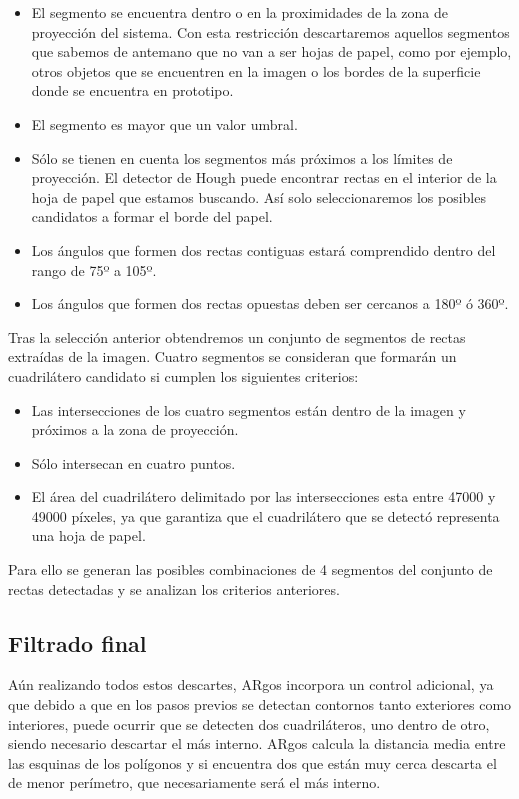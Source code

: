 \begin{itemize}
\item El segmento se encuentra dentro o en la proximidades de la zona de proyección del
  sistema. Con esta restricción descartaremos aquellos segmentos que sabemos de antemano que no van
  a ser hojas de papel, como por ejemplo, otros objetos que se encuentren en la imagen o los bordes
  de la superficie donde se encuentra en prototipo.
\item El segmento es mayor que un valor umbral.
\item Sólo se tienen en cuenta los segmentos más próximos a los límites de proyección. El detector
  de Hough puede encontrar rectas en el interior de la hoja de papel que estamos buscando. Así solo
  seleccionaremos los posibles candidatos a formar el borde del papel.
\item Los ángulos que formen dos rectas contiguas estará comprendido dentro del rango de 75º a 105º.
\item Los ángulos que formen dos rectas opuestas deben ser cercanos a 180º ó 360º.
\end{itemize}

Tras la selección anterior obtendremos un conjunto de segmentos de rectas extraídas de la
imagen. Cuatro segmentos se consideran que formarán un cuadrilátero candidato si cumplen los
siguientes criterios:
\begin{itemize}
\item Las intersecciones de los cuatro segmentos están dentro de la imagen y próximos a la zona de
  proyección.
\item Sólo intersecan en cuatro puntos.
\item El área del cuadrilátero delimitado por las intersecciones esta entre 47000 y 49000 píxeles,
  ya que garantiza que el cuadrilátero que se detectó representa una hoja de papel.
\end{itemize}

Para ello se generan las posibles combinaciones de 4 segmentos del conjunto de rectas detectadas y
se analizan los criterios anteriores.

\subsection{Filtrado final}
Aún realizando todos estos descartes, ARgos incorpora un control adicional, ya que debido a que en
los pasos previos se detectan contornos tanto exteriores como interiores, puede ocurrir que se
detecten dos cuadriláteros, uno dentro de otro, siendo necesario descartar el más interno.
ARgos calcula la distancia media entre las esquinas de los polígonos y si encuentra dos que están
muy cerca descarta el de menor perímetro, que necesariamente será el más interno.

